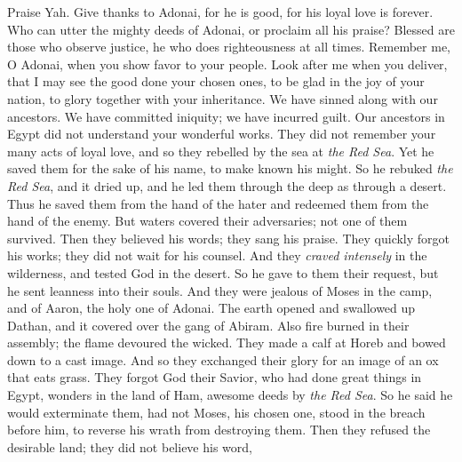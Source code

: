 \begin{biblechapter} %
 Praise Yah. Give thanks to Adonai, for he is good, 
for his loyal love is forever.
\verse Who can utter the mighty deeds of Adonai, 
or proclaim all his praise?
\verse Blessed are those who observe justice, 
he who does righteousness at all times.
\verse Remember me, O Adonai, when you show favor to your people. 
Look after me when you deliver,
\verse that I may see the good done your chosen ones, 
to be glad in the joy of your nation, 
to glory together with your inheritance.
\verse We have sinned along with our ancestors. 
We have committed iniquity; we have incurred guilt.
\verse Our ancestors in Egypt did not understand your wonderful works. 
They did not remember your many acts of loyal love, 
and so they rebelled by the sea at \textit{the Red Sea}.
\verse Yet he saved them for the sake of his name, 
to make known his might.
\verse So he rebuked \textit{the Red Sea}, and it dried up, 
and he led them through the deep as through a desert.
\verse Thus he saved them from the hand of the hater 
and redeemed them from the hand of the enemy.
\verse But waters covered their adversaries; 
not one of them survived.
\verse Then they believed his words; 
they sang his praise.
\verse They quickly forgot his works; 
they did not wait for his counsel.
\verse And they \textit{craved intensely} in the wilderness, 
and tested God in the desert.
\verse So he gave to them their request, 
but he sent leanness into their souls.
\verse And they were jealous of Moses in the camp, 
and of Aaron, the holy one of Adonai.
\verse The earth opened and swallowed up Dathan, 
and it covered over the gang of Abiram.
\verse Also fire burned in their assembly; 
the flame devoured the wicked.
\verse They made a calf at Horeb 
and bowed down to a cast image.
\verse And so they exchanged their glory 
for an image of an ox that eats grass.
\verse They forgot God their Savior, 
who had done great things in Egypt,
\verse wonders in the land of Ham, 
awesome deeds by \textit{the Red Sea}.
\verse So he said he would exterminate them, 
had not Moses, his chosen one, 
stood in the breach before him, 
to reverse his wrath from destroying them.
\verse Then they refused the desirable land; 
they did not believe his word,

\end{biblechapter}
